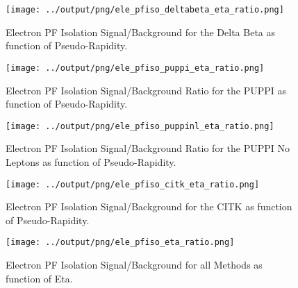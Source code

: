\documentclass[11pt]{book}
\begin{document}
\begin{figure}[htb]
\centering
\texttt{[image: ../output/png/ele\_pfiso\_deltabeta\_eta\_ratio.png]}
\caption{Electron PF Isolation Signal/Background for the Delta Beta as function of Pseudo-Rapidity.}
\label{fig:ele_pfiso_eta_ratio_deltabeta}
\end{figure}

\begin{figure}[htb]
\centering
\texttt{[image: ../output/png/ele\_pfiso\_puppi\_eta\_ratio.png]}
\caption{Electron PF Isolation Signal/Background Ratio for the PUPPI as function of Pseudo-Rapidity.}
\label{fig:ele_pfiso_eta_ratio_puppi}
\end{figure}


\begin{figure}[htb]
\centering
\texttt{[image: ../output/png/ele\_pfiso\_puppinl\_eta\_ratio.png]}
\caption{Electron PF Isolation Signal/Background Ratio for the PUPPI No Leptons as function of Pseudo-Rapidity.}
\label{fig:ele_pfiso_eta_ratio_puppinl}
\end{figure}

\begin{figure}[htb]
\centering
\texttt{[image: ../output/png/ele\_pfiso\_citk\_eta\_ratio.png]}
\caption{Electron PF Isolation Signal/Background for the CITK as function of Pseudo-Rapidity.}
\label{fig:ele_pfiso_eta_ratio_citk}
\end{figure}

\begin{figure}[htb]
\centering
\texttt{[image: ../output/png/ele\_pfiso\_eta\_ratio.png]}
\caption{Electron PF Isolation Signal/Background for all Methods as function of Eta.}
\label{fig:ele_pfiso_eta_ratio}
\end{figure}
\clearpage
\end{document}
